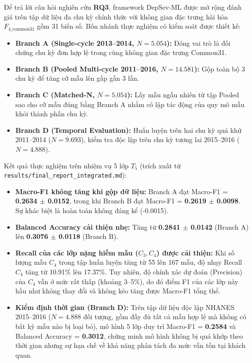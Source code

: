 Để trả lời câu hỏi nghiên cứu \textbf{RQ3}, framework DepSev-ML được mở rộng đánh giá trên tập dữ liệu đa chu kỳ chính thức với không gian đặc trưng hài hòa $F_{4\_\text{common31}}$ gồm 31 biến số. Bốn nhánh thực nghiệm có kiểm soát được thiết kế:
\begin{itemize}
    \item \textbf{Branch A (Single-cycle 2013--2014, $N = 5.054$):} Đóng vai trò là đối chứng chu kỳ đơn hợp lệ trong cùng không gian đặc trưng Common31.
    \item \textbf{Branch B (Pooled Multi-cycle 2011--2016, $N = 14.581$):} Gộp toàn bộ 3 chu kỳ để tăng cỡ mẫu lên gấp gần 3 lần.
    \item \textbf{Branch C (Matched-N, $N = 5.054$):} Lấy mẫu ngẫu nhiên từ tập Pooled sao cho cỡ mẫu đúng bằng Branch A nhằm cô lập tác động của quy mô mẫu khỏi thành phần chu kỳ.
    \item \textbf{Branch D (Temporal Evaluation):} Huấn luyện trên hai chu kỳ quá khứ 2011--2014 ($N = 9.693$), kiểm tra độc lập trên chu kỳ tương lai 2015--2016 ($N = 4.888$).
\end{itemize}

Kết quả thực nghiệm trên nhiệm vụ 5 lớp $T_5$ (trích xuất từ \texttt{results/final\_report\_integrated.md}):
\begin{itemize}
    \item \textbf{Macro-F1 không tăng khi gộp dữ liệu:} Branch A đạt Macro-F1 = \textbf{0.2634 $\pm$ 0.0152}, trong khi Branch B đạt Macro-F1 = \textbf{0.2619 $\pm$ 0.0098}. Sự khác biệt là hoàn toàn không đáng kể (-0.0015).
    \item \textbf{Balanced Accuracy cải thiện nhẹ:} Tăng từ \textbf{0.2841 $\pm$ 0.0142} (Branch A) lên \textbf{0.3076 $\pm$ 0.0118} (Branch B).
    \item \textbf{Recall của các lớp nặng hiếm mẫu ($C_3, C_4$) được cải thiện:} Khi số lượng mẫu $C_4$ trong tập huấn luyện tăng từ 55 lên 167 mẫu, độ nhạy Recall $C_4$ tăng từ 10.91\% lên 17.37\%. Tuy nhiên, độ chính xác dự đoán (Precision) của $C_4$ vẫn ở mức rất thấp (khoảng 3--5\%), do đó điểm F1 của các lớp này hầu như không thay đổi và không kéo tăng được Macro-F1 tổng thể.
    \item \textbf{Kiểm định thời gian (Branch D):} Trên tập dữ liệu độc lập NHANES 2015--2016 ($N = 4.888$ đối tượng, gồm đầy đủ tất cả mẫu hợp lệ mà không có bất kỳ mẫu nào bị loại bỏ), mô hình 5 lớp duy trì Macro-F1 = \textbf{0.2584} và Balanced Accuracy = \textbf{0.3012}, chứng minh mô hình không bị quá khớp theo thời gian nhưng sự hạn chế về khả năng phân tách đa mức vẫn tồn tại khách quan.

\end{itemize}

